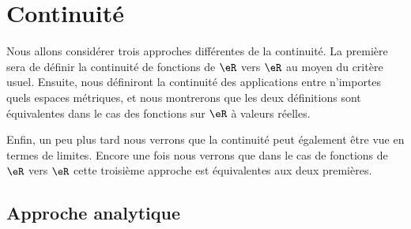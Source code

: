 \documentclass{article}
\begin{document}
\section{Continuité}

Nous allons considérer trois approches différentes de la continuité. La première sera de définir la continuité de fonctions de $\eR$ vers $\eR$ au moyen du critère usuel. Ensuite, nous définiront la continuité des applications entre n'importes quels espaces métriques, et nous montrerons que les deux définitions sont équivalentes dans le cas des fonctions sur $\eR$ à valeurs réelles.

Enfin, un peu plus tard nous verrons que la continuité peut également être vue en termes de limites. Encore une fois nous verrons que dans le cas de fonctions de $\eR$ vers $\eR$ cette troisième approche est équivalentes aux deux premières.

\subsection{Approche analytique}
\end{document}
